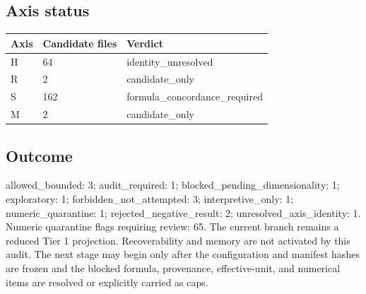 \documentclass[11pt]{article}
\begin{document}
\subsection*{Axis status}
\begin{tabular}{lll}\toprule Axis & Candidate files & Verdict \\\midrule
H & 64 & identity\_unresolved \\
R & 2 & candidate\_only \\
S & 162 & formula\_concordance\_required \\
M & 2 & candidate\_only \\
\bottomrule\end{tabular}
\subsection*{Outcome}
allowed\_bounded: 3; audit\_required: 1; blocked\_pending\_dimensionality: 1; exploratory: 1; forbidden\_not\_attempted: 3; interpretive\_only: 1; numeric\_quarantine: 1; rejected\_negative\_result: 2; unresolved\_axis\_identity: 1.\\
Numeric quarantine flags requiring review: 65.
The current branch remains a reduced Tier 1 projection. Recoverability and memory are not activated by this audit. The next stage may begin only after the configuration and manifest hashes are frozen and the blocked formula, provenance, effective-unit, and numerical items are resolved or explicitly carried as caps.
\end{document}
